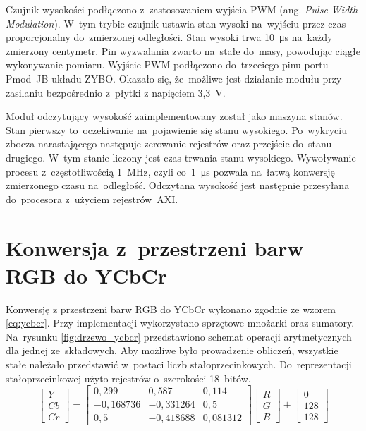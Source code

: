 Czujnik wysokości podłączono z~zastosowaniem wyjścia PWM (ang. \textit{Pulse-Width Modulation}). 
W~tym trybie czujnik ustawia stan wysoki na~wyjściu przez czas proporcjonalny do~zmierzonej odległości. 
Stan wysoki trwa 10~\si{\micro\second} na~każdy zmierzony centymetr. 
Pin wyzwalania zwarto na~stałe do~masy, powodując ciągłe wykonywanie pomiaru. 
Wyjście PWM podłączono do~trzeciego pinu portu Pmod~JB układu ZYBO. 
Okazało się, że~możliwe jest działanie modułu przy zasilaniu bezpośrednio z~płytki z napięciem 3,3~V.

Moduł odczytujący wysokość zaimplementowany został jako maszyna stanów. 
Stan pierwszy to~oczekiwanie na~pojawienie się stanu wysokiego. 
Po~wykryciu zbocza narastającego następuje zerowanie rejestrów oraz przejście do~stanu drugiego. 
W~tym stanie liczony jest czas trwania stanu wysokiego. 
Wywoływanie procesu z~częstotliwością 1~MHz, czyli co~1~\si{\micro\second} pozwala na~łatwą konwersję zmierzonego czasu na~odległość. 
Odczytana wysokość jest następnie przesyłana do~procesora z~użyciem rejestrów~AXI.


\section{Konwersja z~przestrzeni barw RGB do YCbCr}
\label{subsec:konwersja}
Konwersję z przestrzeni barw RGB do YCbCr wykonano zgodnie ze wzorem \ref{eq:ycbcr}. 
Przy implementacji wykorzystano sprzętowe mnożarki oraz sumatory. 
Na~rysunku \ref{fig:drzewo_ycbcr} przedstawiono schemat operacji arytmetycznych dla jednej ze~składowych. 
Aby możliwe było prowadzenie obliczeń, wszystkie stałe należało przedstawić w~postaci liczb stałoprzecinkowych. 
Do~reprezentacji stałoprzecinkowej użyto rejestrów o~szerokości 18~bitów.
\begin{equation}
\label{eq:ycbcr}
\begin{bmatrix} Y \\ 
Cb\\
Cr
\end{bmatrix}=
\begin{bmatrix} 0,299 & 0,587 & 0,114\\ 
-0,168736 & -0,331264 & 0,5\\
0,5 & -0,418688 & 0,081312
\end{bmatrix}
\begin{bmatrix} R\\
G\\
B
\end{bmatrix}+
\begin{bmatrix} 0\\
128\\
128
\end{bmatrix}
\end{equation}


